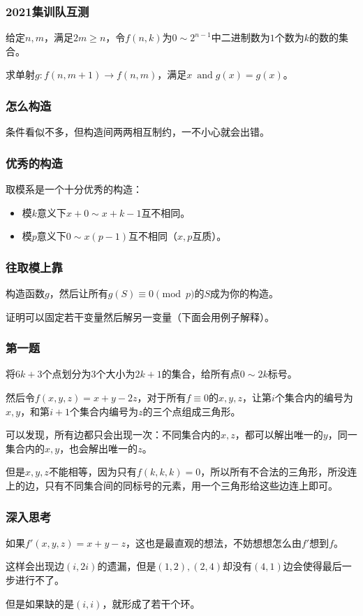 \documentclass[10pt]{beamer}
\begin{document}
	\clearpage
	\begin{frame}
		\frametitle{2021集训队互测}
	
		给定$n,m$，满足$2m\ge n$，令$f(n,k)$为$0\sim 2^{n-1}$中二进制数为$1$个数为$k$的数的集合。

		求单射$g:f(n,m+1)\rightarrow f(n,m)$，满足$x~\operatorname{and} g(x)=g(x)$。
	
	\end{frame}
	\clearpage
	\begin{frame}
		\frametitle{怎么构造}
	
		条件看似不多，但构造间两两相互制约，一不小心就会出错。
	
	\end{frame}
	\clearpage
	\begin{frame}
		\frametitle{优秀的构造}
	
		取模系是一个十分优秀的构造：
		
		\begin{itemize}
			\item 模$k$意义下$x+0\sim x+k-1$互不相同。
			\item 模$p$意义下$0\sim x(p-1)$互不相同（$x,p$互质）。
		\end{itemize}
	
	\end{frame}
	\clearpage
	\begin{frame}
		\frametitle{往取模上靠}

		构造函数$g$，然后让所有$g(S)\equiv 0 \pmod p$的$S$成为你的构造。

		证明可以固定若干变量然后解另一变量（下面会用例子解释）。
		
	\end{frame}
	\clearpage
	\begin{frame}
		\frametitle{第一题}
	
		将$6k+3$个点划分为$3$个大小为$2k+1$的集合，给所有点$0\sim 2k$标号。
		
		然后令$f(x,y,z)=x+y-2z$，对于所有$f\equiv 0$的$x,y,z$，让第$i$个集合内的编号为$x,y$，和第$i+1$个集合内编号为$z$的三个点组成三角形。

		可以发现，所有边都只会出现一次：不同集合内的$x,z$，都可以解出唯一的$y$，同一集合内的$x,y$，也会解出唯一的$z$。
		
		但是$x,y,z$不能相等，因为只有$f(k,k,k)=0$，所以所有不合法的三角形，所没连上的边，只有不同集合间的同标号的元素，用一个三角形给这些边连上即可。
	
	\end{frame}
	\clearpage
	\begin{frame}
		\frametitle{深入思考}
	
		如果$f'(x,y,z)=x+y-z$，这也是最直观的想法，不妨想想怎么由$f'$想到$f$。

		这样会出现边$(i,2i)$的遗漏，但是$(1,2),(2,4)$却没有$(4,1)$边会使得最后一步进行不了。

		但是如果缺的是$(i,i)$，就形成了若干个环。
	
	\end{frame}
\end{document}

